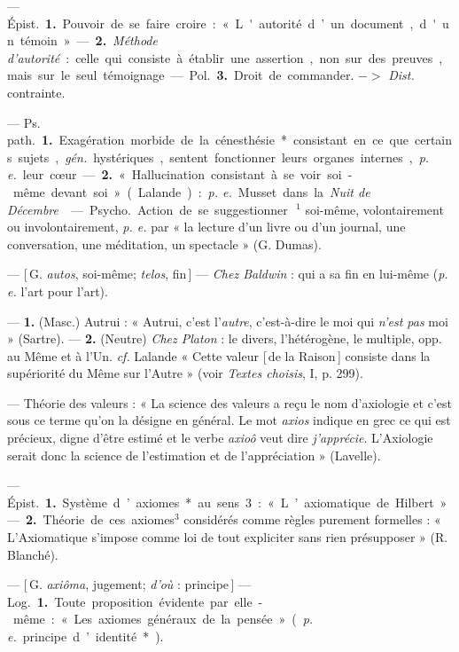\begin{itemize}[leftmargin=1cm, label=, itemsep=1pt]
 — \si{Épist.} {\bf 1.} Pouvoir de se
faire croire : « L'autorité d’un document, d'un témoin ». — {\bf 2.} {\it Méthode
d'autorité} : celle qui consiste à établir
une assertion, non sur des preuves,
mais sur le seul témoignage.

— \si{Pol.} {\bf 3.} Droit de commander.
$->$ {\it Dist.} contrainte.

 — \si{Ps. path.} {\bf 1.} Exagération morbide de
la cénesthésie* consistant en ce que certains sujets,  {\it gén.}
hystériques, sentent fonctionner
leurs organes internes, {\it p. e.} leur
cœur. — {\bf 2.} « Hallucination consistant à se voir soi-même devant soi »
(Lalande) : {\it p. e.} Musset dans la {\it Nuit
de Décembre}.

 — \si{Psycho.} Action
de se suggestionner\,$^1$ soi-même, volontairement ou involontairement,
{\it p. e.} par « la lecture d’un livre ou
d’un journal, une conversation, une
méditation, un spectacle » (G.
Dumas).

 — [\,G. {\it autos}, soi-même; {\it telos},
fin\,] — {\it Chez Baldwin} : qui a sa fin
en lui-même ({\it p. e.} l’art pour l’art).

 — {\bf 1.} (Masc.) Autrui :
« Autrui, c’est l’{\it autre}, c’est-à-dire
le moi qui {\it n’est pas} moi » (Sartre). —
{\bf 2.} (Neutre) {\it Chez Platon} : le divers,
l’hétérogène, le multiple, opp. au
Même et à l’Un. {\it cf.}  Lalande
« Cette valeur [\,de la Raison\,] consiste
dans la supériorité du Même sur
l'Autre » (voir {\it Textes choisis}, I,
p. 299).

 — Théorie des valeurs : « La
science des valeurs a reçu le nom
d’axiologie et c'est sous ce terme
qu’on la désigne en général. Le mot
{\it axios} indique en grec ce qui est précieux, digne d'être estimé et le
verbe {\it axioô} veut dire {\it j'apprécie}.
L’Axiologie serait donc la science
de l’estimation et de l’appréciation »
(Lavelle).

 — \si{Épist.} {\bf 1.} Système
d’axiomes* au sens 3 : « L’axiomatique de Hilbert ». — {\bf 2.} Théorie de
ces axiomes$^3$ considérés comme
règles purement formelles : « L’Axiomatique s'impose comme loi de tout
expliciter sans rien présupposer »
(R. Blanché).

 — [\,G. {\it axiôma}, jugement; {\it d'où} :
principe\,] — \si{Log.} {\bf 1.} Toute proposition évidente par elle-même : « Les
axiomes généraux de la pensée » ({\it p. e.}
principe d’identité*).


\end{itemize}
